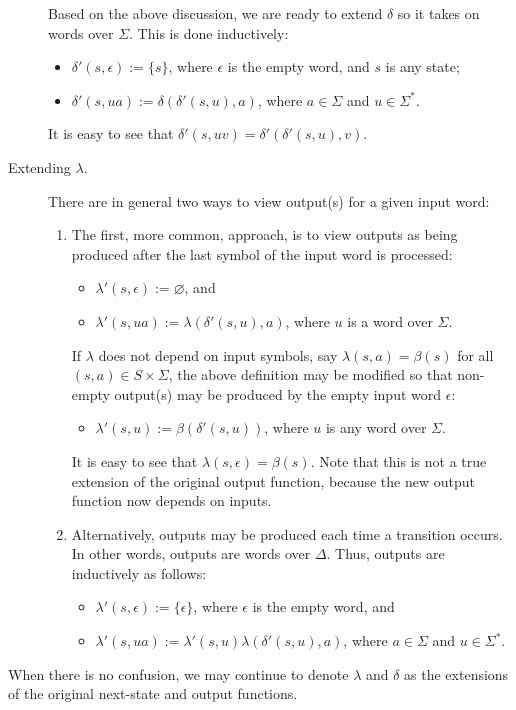 \documentclass[12pt]{article}
\begin{document}
\begin{description}
Based on the above discussion, we are ready to extend $\delta$ so it takes on words over $\Sigma$.  This is done inductively:
\begin{itemize}
\item $\delta'(s,\epsilon):=\lbrace s\rbrace$, where $\epsilon$ is the empty word, and $s$ is any state; 
\item $\delta'(s, u a):= \delta(\delta'(s,u),a)$, where $a\in \Sigma$ and $u\in \Sigma^*$.
\end{itemize}
It is easy to see that $\delta'(s, uv)= \delta'(\delta'(s,u),v)$.
\item[Extending $\lambda$.]  There are in general two ways to view output(s) for a given input word:
\begin{enumerate}
\item The first, more common, approach, is to view outputs as being produced after the last symbol of the input word is processed:
\begin{itemize}
\item $\lambda'(s, \epsilon):= \varnothing$, and
\item $\lambda'(s, u a):= \lambda(\delta'(s,u),a)$, where $u$ is a word over $\Sigma$.
\end{itemize}
If $\lambda$ does not depend on input symbols, say $\lambda(s,a)=\beta(s)$ for all $(s,a)\in S\times \Sigma$, the above definition may be modified so that non-empty output(s) may be produced by the empty input word $\epsilon$:
\begin{itemize}
\item $\lambda'(s,u):= \beta(\delta'(s,u))$, where $u$ is any word over $\Sigma$.
\end{itemize}
It is easy to see that $\lambda(s,\epsilon)=\beta(s)$.  Note that this is not a true extension of the original output function, because the new output function now depends on inputs.
\item Alternatively, outputs may be produced each time a transition occurs.  In other words, outputs are words over $\Delta$.  Thus, outputs are inductively as follows: 
\begin{itemize}
\item $\lambda'(s, \epsilon):= \lbrace \epsilon \rbrace$, where $\epsilon$ is the empty word, and 
\item $\lambda'(s, u a):= \lambda'(s,u) \lambda(\delta'(s,u),a)$, where $a\in \Sigma$ and $u\in \Sigma^*$.
\end{itemize}
\end{enumerate}
\end{description}
When there is no confusion, we may continue to denote $\lambda$ and $\delta$ as the extensions of the original next-state and output functions.
\end{document}

